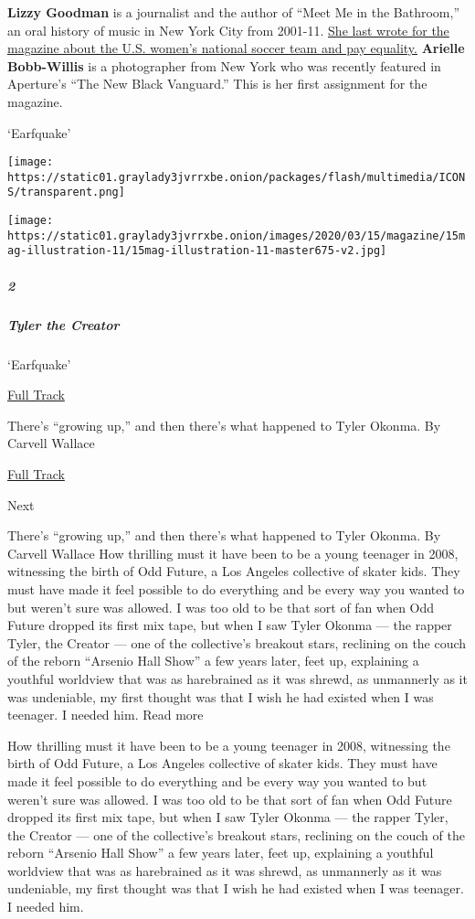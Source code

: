 \textbf{Lizzy Goodman} is a journalist and the author of ``Meet Me in
the Bathroom,'' an oral history of music in New York City from 2001-11.
\href{https://www.nytimes3xbfgragh.onion/2019/06/10/magazine/womens-soccer-inequality-pay.html}{She
last wrote for the magazine about the U.S. women's national soccer team
and pay equality.} \textbf{Arielle Bobb-Willis} is a photographer from
New York who was recently featured in Aperture's ``The New Black
Vanguard.'' This is her first assignment for the magazine.

`Earfquake'

\texttt{[image: https://static01.graylady3jvrrxbe.onion/packages/flash/multimedia/ICONS/transparent.png]}

\texttt{[image: https://static01.graylady3jvrrxbe.onion/images/2020/03/15/magazine/15mag-illustration-11/15mag-illustration-11-master675-v2.jpg]}

\hypertarget{2}{%
\subparagraph{2}\label{2}}

\hypertarget{tyler-the-creator}{%
\subparagraph{Tyler the Creator}\label{tyler-the-creator}}

`Earfquake'

\href{https://open.spotify.com/track/5hVghJ4KaYES3BFUATCYn0}{ Full
Track}

There's ``growing up,'' and then there's what happened to Tyler Okonma.
By Carvell Wallace

\href{https://open.spotify.com/track/5hVghJ4KaYES3BFUATCYn0}{Full Track
}

Next

There's ``growing up,'' and then there's what happened to Tyler Okonma.
By Carvell Wallace How thrilling must it have been to be a young
teenager in 2008, witnessing the birth of Odd Future, a Los Angeles
collective of skater kids. They must have made it feel possible to do
everything and be every way you wanted to but weren't sure was allowed.
I was too old to be that sort of fan when Odd Future dropped its first
mix tape, but when I saw Tyler Okonma --- the rapper Tyler, the Creator
­--- one of the collective's breakout stars, reclining on the couch of
the reborn ``Arsenio Hall Show'' a few years later, feet up, explaining
a youthful worldview that was as harebrained as it was shrewd, as
unmannerly as it was undeniable, my first thought was that I wish he had
existed when I was teenager. I needed him. Read more

How thrilling must it have been to be a young teenager in 2008,
witnessing the birth of Odd Future, a Los Angeles collective of skater
kids. They must have made it feel possible to do everything and be every
way you wanted to but weren't sure was allowed. I was too old to be that
sort of fan when Odd Future dropped its first mix tape, but when I saw
Tyler Okonma --- the rapper Tyler, the Creator ­--- one of the
collective's breakout stars, reclining on the couch of the reborn
``Arsenio Hall Show'' a few years later, feet up, explaining a youthful
worldview that was as harebrained as it was shrewd, as unmannerly as it
was undeniable, my first thought was that I wish he had existed when I
was teenager. I needed him.

